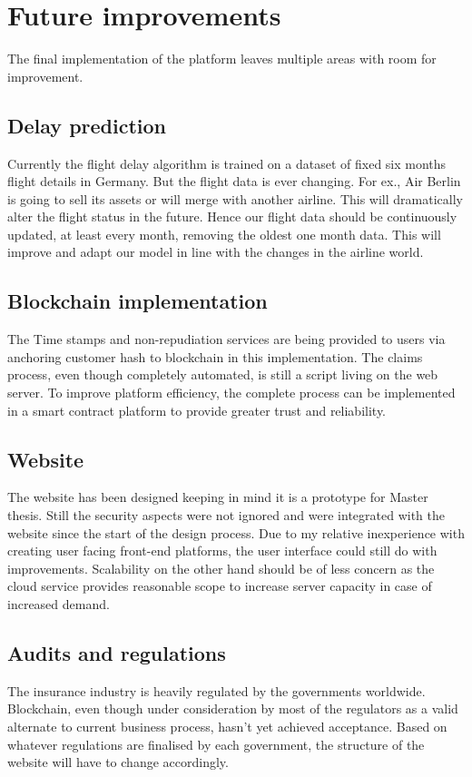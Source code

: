 \section{Future improvements}
The final implementation of the platform leaves multiple areas with room for improvement. 
\subsection{Delay prediction}
Currently the flight delay algorithm is trained on a dataset of fixed six months flight details in Germany. But the flight data is ever changing. For ex., Air Berlin is going to sell its assets or will merge with another airline. This will dramatically alter the flight status in the future. Hence our flight data should be continuously updated, at least every month, removing the oldest one month data. This will improve and adapt our model in line with the changes in the airline world.

\subsection{Blockchain implementation}
The Time stamps and non-repudiation services are being provided to users via anchoring customer hash to blockchain in this implementation. The claims process, even though completely automated, is still a script living on the web server. To improve platform efficiency, the complete process can be implemented in a smart contract platform to provide greater trust and reliability.

\subsection{Website}
The website has been designed keeping in mind it is a prototype for Master thesis. Still the security aspects were not ignored and were integrated with the website since the start of the design process. Due to my relative inexperience with creating user facing front-end platforms, the user interface could still do with improvements. Scalability on the other hand should be of less concern as the cloud service provides reasonable scope to increase server capacity in case of increased demand.

\subsection{Audits and regulations}
The insurance industry is heavily regulated by the governments worldwide. Blockchain, even though under consideration by most of the regulators as a valid alternate to current business process, hasn't yet achieved acceptance. Based on whatever regulations are finalised by each government, the structure of the website will have to change accordingly.

